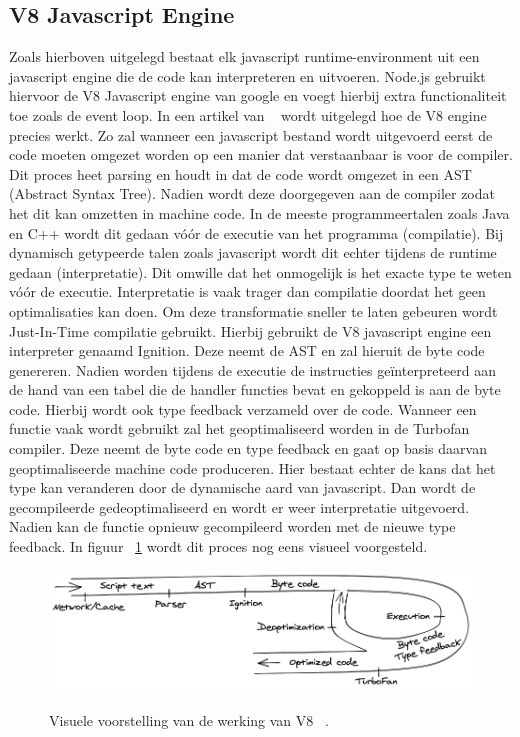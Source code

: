 \subsection{V8 Javascript Engine}
Zoals hierboven uitgelegd bestaat elk javascript runtime-environment uit een javascript engine die de code kan interpreteren en uitvoeren.
Node.js gebruikt hiervoor de V8 Javascript engine van google en voegt hierbij extra functionaliteit toe zoals de event loop.
In een artikel van ~\textcite{Lyamkin2020} wordt uitgelegd hoe de V8 engine precies werkt. 
Zo zal wanneer een javascript bestand wordt uitgevoerd eerst de code moeten omgezet worden op een manier dat verstaanbaar is voor de compiler.
Dit proces heet parsing en houdt in dat de code wordt omgezet in een AST (Abstract Syntax Tree). 
Nadien wordt deze doorgegeven aan de compiler zodat het dit kan omzetten in machine code. 
In de meeste programmeertalen zoals Java en C++ wordt dit gedaan vóór de executie van het programma (compilatie).
Bij dynamisch getypeerde talen zoals javascript wordt dit echter tijdens de runtime gedaan (interpretatie). 
Dit omwille dat het onmogelijk is het exacte type te weten vóór de executie.
Interpretatie is vaak trager dan compilatie doordat het geen optimalisaties kan doen.
Om deze transformatie sneller te laten gebeuren wordt Just-In-Time compilatie gebruikt.
Hierbij gebruikt de V8 javascript engine een interpreter genaamd Ignition. Deze neemt de AST en zal hieruit de byte code genereren.
Nadien worden tijdens de executie de instructies geïnterpreteerd aan de hand van een tabel die de handler functies bevat en gekoppeld 
is aan de byte code.
Hierbij wordt ook type feedback verzameld over de code. 
Wanneer een functie vaak wordt gebruikt zal het geoptimaliseerd worden in de Turbofan compiler.
Deze neemt de byte code en type feedback en gaat op basis daarvan geoptimaliseerde machine code produceren.
Hier bestaat echter de kans dat het type kan veranderen door de dynamische aard van javascript. 
Dan wordt de gecompileerde gedeoptimaliseerd en wordt er weer interpretatie uitgevoerd.
Nadien kan de functie opnieuw gecompileerd worden met de nieuwe type feedback.
In figuur ~\ref{fig:v8} wordt dit proces nog eens visueel voorgesteld.
\begin{figure}[h]
    \centering
    \includegraphics[width=.9\textwidth]{graphics/v8.png}
    \caption{\label{fig:v8}}Visuele voorstelling van de werking van V8 ~\autocite{Lyamkin2020}.
\end{figure}

